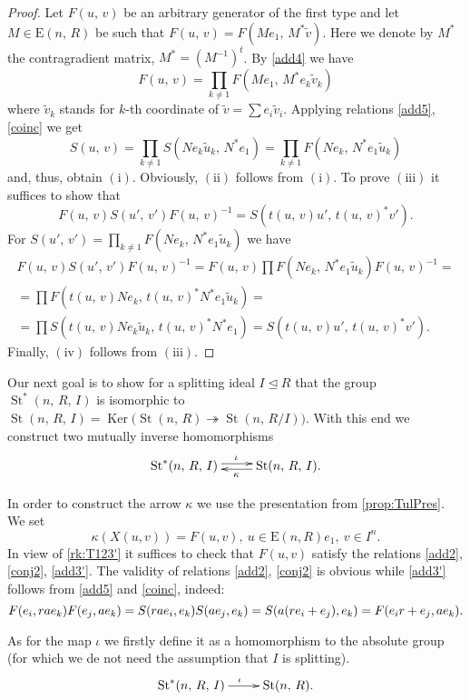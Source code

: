 \documentclass[11pt]{amsart}
\theoremstyle{plain} \declaretheorem[name=Theorem, Refname={Theorem,Theorems}]{tm} \Crefname{tm}{Theorem}{Theorems}
\numberwithin{equation}{section}
\theoremstyle{definition} \newtheorem{df}[lm]{Definition} \Crefname{df}{Definition}{Definitions}
\theoremstyle{remark} \newtheorem{rk}[lm]{Remark} \Crefname{rk}{Remark}{Remarks}
\newcommand{\Ker}{\mathop{\mathrm{Ker}}\nolimits}
\newcommand{\E}{{\mathrm{E}}}
\newcommand{\St}{\mathop{\mathrm{St}}\nolimits}
\newcommand{\epi}{\twoheadrightarrow}
\newcommand{\inv}{^{-1}}
\begin{document}
\begin{proof}
Let $F(u,\,v)$ be an arbitrary generator of the first type and let $M\in\E(n,\,R)$ be such that $F(u,\,v)=F(Me_1,\,M^*\tilde v)$. 
Here we denote by $M^*$ the contragradient matrix, $M^*=(M\inv)^t$. 
By \eqref{add4} we have $$F(u,\,v)=\prod\limits_{k\neq1}F(Me_1,\,M^*e_k\tilde v_k)$$
where $\tilde v_k$ stands for $k$-th coordinate of $\tilde v=\sum e_i\tilde v_i$.
Applying relations \eqref{add5}, \eqref{coinc} we get
$$S(u,\,v)=\prod\limits_{k\neq1}S(Ne_k\tilde u_k,\,N^*e_1)=\prod\limits_{k\neq1}F(Ne_k,\,N^*e_1\tilde u_k)$$
and, thus, obtain $(\mathrm{i})$. Obviously, $(\mathrm{ii})$ follows from $(\mathrm{i})$. 
To prove $(\mathrm{iii})$ it suffices to show that
$$F(u,\,v)S(u',\,v')F(u,\,v)\inv=S(t(u,\,v)u',\,t(u,\,v)^*v').$$
For $S(u',\,v')=\prod_{k\neq 1} F(Ne_k,\,N^*e_1\tilde u_k)$ we have
\begin{multline*}
F(u,\,v)S(u',\,v')F(u,\,v)\inv=F(u,\,v)\prod F(Ne_k,\,N^*e_1\tilde u_k)F(u,\,v)\inv=\\
=\prod F(t(u,\,v)Ne_k,\,t(u,\,v)^*N^*e_1\tilde u_k)=\\
=\prod S(t(u,\,v)Ne_k\tilde u_k,\,t(u,\,v)^*N^*e_1)=S(t(u,\,v)u',\,t(u,\,v)^*v').
\end{multline*}
Finally, $(\mathrm{iv})$ follows from $(\mathrm{iii})$.
\end{proof}

Our next goal is to show for a splitting ideal $I\trianglelefteq R$ that the group $\St^*(n,\,R,\,I)$ is isomorphic to $\St(n,\,R,\,I)=\Ker\big(\St(n,\,R)\epi\St(n,\,R/I)\big)$.
With this end we construct two mutually inverse homomorphisms
$$\xymatrix{\St^*(n,\,R,\,I)\ar@<0.5ex>[r]^{\iota}&\St(n,\,R,\,I)\ar@<0.5ex>[l]^{\kappa}.}$$

In order to construct the arrow $\kappa$ we use the presentation from \cref{prop:TulPres}.
We set $$\kappa(X(u,v)) = F(u,v),\ u\in \E(n, R)e_1,\ v\in I^n.$$ 
In view of \cref{rk:T123'} it suffices to check that $F(u,v)$ satisfy the relations \eqref{add2}, \eqref{conj2}, \eqref{add3'}.
The validity of relations \eqref{add2}, \eqref{conj2} is obvious while \eqref{add3'} follows from \eqref{add5} and \eqref{coinc}, indeed:
$$ F(e_i, rae_k) F(e_j, ae_k) = S(rae_i, e_k) S(ae_j, e_k) = S(a(re_i+e_j), e_k) = F(e_ir+e_j, ae_k). \qedhere $$

As for the map $\iota$ we firstly define it as a homomorphism to the absolute group (for which we de not need the assumption that $I$ is splitting).
$$\xymatrix{\St^*(n,\,R,\,I)\ar@<0.0ex>[r]^{\iota}&\St(n,\,R).}$$
\end{document}
